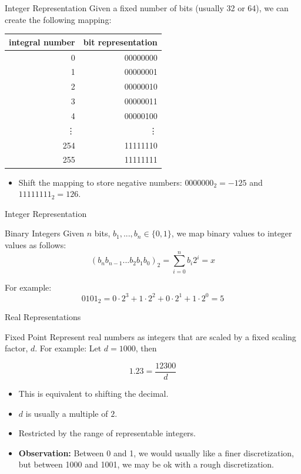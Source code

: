\documentclass[serif,xcolor=pdftex,dvipsnames,table,hyperref={bookmarks=false,breaklinks}]{beamer}
\begin{document}
\begin{frame}[t]{Integer Representation}
	Given a fixed number of bits (usually 32 or 64), we can create the following mapping:
	
	\pause
	\centering
	\begin{tabular}{|r|r|}\hline
		integral number & bit representation\\\hline\hline
		0 & 00000000\\
		1 & 00000001\\
		2 & 00000010\\
		3 & 00000011\\
		4 & 00000100\\
		\vdots & \vdots\\
		254 & 11111110\\
		255 & 11111111\\\hline
	\end{tabular}
	
	\pause
	\begin{itemize}[<+->]
		\item Shift the mapping to store negative numbers: $0000000_2 = -125$ and $11111111_2 = 126$. 
	\end{itemize}
		
\end{frame}

\begin{frame}[t]{Integer Representation}
	\centering
	\begin{block}{Binary Integers}
		Given $n$ bits, $b_1,...,b_n\in \{0,1\}$, we map binary values to integer values as follows: 
		\Large{$$(b_nb_{n-1}...b_2b_1b_0)_2 = \sum_{i=0}^n b_i2^i = x$$}
	\end{block}
	
	\pause
	For example:
	\Large{$$0101_2 = 0\cdot2^3 + 1\cdot2^2 + 0\cdot2^1 + 1\cdot2^0 = 5$$}
\end{frame}

\begin{frame}[t]{Real Representations}
	\begin{block}{Fixed Point}
		Represent real numbers as integers that are scaled by a fixed scaling factor, $d$. For example: Let $d = 1000$, then
		
		$$1.23 = \frac{12300}{d}$$
	\end{block}
	\pause
	\begin{itemize}[<+->]
		\item This is equivalent to shifting the decimal.
		\item $d$ is usually a multiple of $2$.
		\item Restricted by the range of representable integers.
		\item \textbf{Observation:} Between 0 and 1, we would usually like a finer discretization, but between 1000 and 1001, we may be ok with a rough discretization.
	\end{itemize} 
\end{frame}
\end{document}
